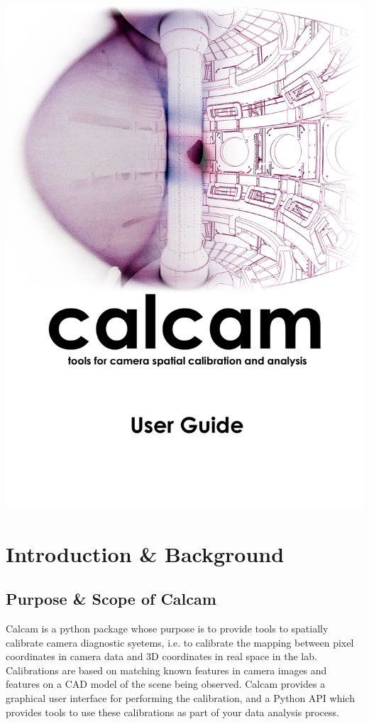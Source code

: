 \documentclass[12pt]{article}
\begin{document}
\begin{center}
  \includegraphics[width=\textwidth]{coverpage.png}
\end{center}


\newpage
\tableofcontents
\newpage
{}


\section{Introduction \& Background}

\subsection{Purpose \& Scope of Calcam}

Calcam is a python package whose purpose is to provide tools to spatially calibrate camera diagnostic syetems, i.e. to calibrate the mapping between pixel coordinates in camera data and 3D coordinates in real space in the lab. Calibrations are based on matching known features in camera images and features on a CAD model of the scene being observed. Calcam provides a graphical user interface for performing the calibration, and a Python API which provides tools to use these calibrations as part of your data analysis process.
\end{document}
